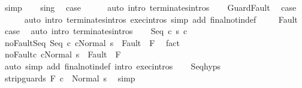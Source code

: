 \begin{isabellebody}
\ simp\isanewline
\ \ \isamarkupfalse%
\ s{\isacharunderscore}in{\isacharunderscore}g\ \isamarkupfalse%
\ {\isacharquery}case\isanewline
\ \ \ \ \isamarkupfalse%
\ {\isacharparenleft}auto\ intro{\isacharcolon}\ terminates{\isachardot}intros{\isacharparenright}\isanewline
{}\isamarkupfalse%
\isanewline
\ \ \isamarkupfalse%
\ GuardFault\ \isamarkupfalse%
\ {\isacharquery}case\ \isanewline
\ \ \ \ \isamarkupfalse%
\ {\isacharparenleft}auto\ intro{\isacharcolon}\ terminates{\isachardot}intros\ exec{\isachardot}intros\ simp\ add{\isacharcolon}\ final{\isacharunderscore}notin{\isacharunderscore}def\ {\isacharparenright}\isanewline
{}\isamarkupfalse%
\isanewline
\ \ \isamarkupfalse%
\ Fault\ \isamarkupfalse%
\ {\isacharquery}case\ \isamarkupfalse%
\ {\isacharparenleft}auto\ intro{\isacharcolon}\ terminates{\isachardot}intros{\isacharparenright}\isanewline
{}\isamarkupfalse%
\isanewline
\ \ \isamarkupfalse%
\ {\isacharparenleft}Seq\ c{}\ s\ c{}{\isacharparenright}\ \isanewline
\ \ \isamarkupfalse%
\ noFault{\isacharunderscore}Seq{\isacharcolon}\ {\isachardoublequoteopen}{\isasymGamma}{\isasymturnstile}{\isasymlangle}Seq\ c{}\ c{}{\isacharcomma}Normal\ s\ {\isasymrangle}\ {\isasymRightarrow}{\isasymnotin}Fault\ {\isacharbackquote}\ F{\isachardoublequoteclose}\ \isamarkupfalse%
\ fact\isanewline
\ \ \isamarkupfalse%
\ noFault{\isacharunderscore}c{}{\isacharcolon}\ {\isachardoublequoteopen}{\isasymGamma}{\isasymturnstile}{\isasymlangle}c{}{\isacharcomma}Normal\ s\ {\isasymrangle}\ {\isasymRightarrow}{\isasymnotin}Fault\ {\isacharbackquote}\ F{\isachardoublequoteclose}\isanewline
\ \ \ \ \isamarkupfalse%
\ {\isacharparenleft}auto\ simp\ add{\isacharcolon}\ final{\isacharunderscore}notin{\isacharunderscore}def\ intro{\isacharcolon}\ exec{\isachardot}intros{\isacharparenright}\isanewline
\ \ \isamarkupfalse%
\ Seq{\isachardot}hyps\ \isamarkupfalse%
\ {\isachardoublequoteopen}{\isasymGamma}{\isasymturnstile}strip{\isacharunderscore}guards\ F\ c{}\ {\isasymdown}\ Normal\ s{\isachardoublequoteclose}\ \isamarkupfalse%
\ simp\isanewline
\ \ \isamarkupfalse%
\isanewline
\ \ \isacommand{{\isacharbraceleft}}\isamarkupfalse%
\isanewline
\ \ \ \ \isamarkupfalse%

\end{isabellebody}
